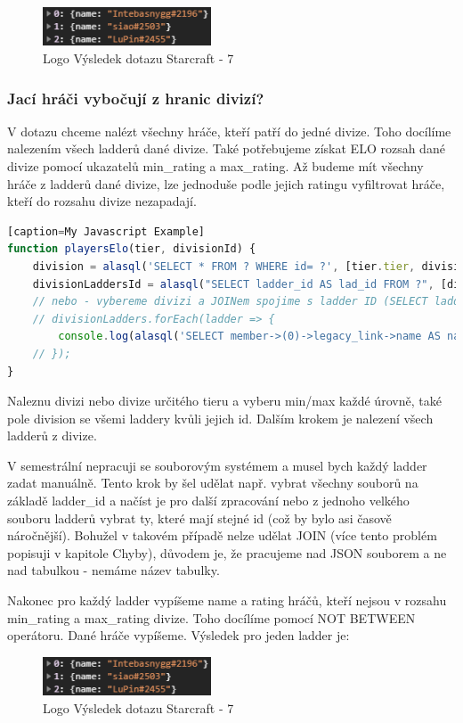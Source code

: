 \documentclass[a4, titlepage]{article}
\begin{document}
\begin{figure}[h]
    \centering
    \includegraphics[width=5cm]{S7}
    \caption{Logo Výsledek dotazu Starcraft - 7}
\end{figure} 

\subsubsection{Jací hráči vybočují z hranic divizí?}
V dotazu chceme nalézt všechny hráče, kteří patří do jedné divize. Toho docílíme nalezením všech ladderů dané divize. Také potřebujeme získat ELO rozsah dané divize pomocí ukazatelů min\_rating a max\_rating. Až budeme mít všechny hráče z ladderů dané divize, lze jednoduše podle jejich ratingu vyfiltrovat hráče, kteří do rozsahu divize nezapadají. 
\begin{lstlisting}[language=JavaScript][caption=My Javascript Example]
function playersElo(tier, divisionId) {
    division = alasql('SELECT * FROM ? WHERE id= ?', [tier.tier, divisionId]);
    divisionLaddersId = alasql("SELECT ladder_id AS lad_id FROM ?", [division[0].division]);
    // nebo - vybereme divizi a JOINem spojime s ladder ID (SELECT ladder.team FROM ladder INNER JOIN division ON division.ladder=ladder.id)
    // divisionLadders.forEach(ladder => {
    	console.log(alasql('SELECT member->(0)->legacy_link->name AS name, rating FROM ? WHERE rating NOT BETWEEN ? AND ?', [ladder230882_1101.team, division[0].min_rating, division[0].max_rating]));
    // });
}
\end{lstlisting}
Naleznu divizi nebo divize určitého tieru a vyberu min/max každé úrovně, také pole division se všemi laddery kvůli jejich id. Dalším krokem je nalezení všech ladderů z divize. 

V semestrální nepracuji se souborovým systémem a musel bych každý ladder zadat manuálně. Tento krok by šel udělat např. vybrat všechny souborů na základě ladder\_id a načíst je pro další zpracování nebo z jednoho velkého souboru ladderů vybrat ty, které mají stejné id (což by bylo asi časově náročnější). Bohužel v takovém případě nelze udělat JOIN (více tento problém popisuji v kapitole Chyby), důvodem je, že pracujeme nad JSON souborem a ne nad tabulkou - nemáme název tabulky.

Nakonec pro každý ladder vypíšeme name a rating hráčů, kteří nejsou v rozsahu min\_rating a max\_rating divize. Toho docílíme pomocí NOT BETWEEN operátoru. Dané hráče vypíšeme. Výsledek pro jeden ladder je: 
\begin{figure}[h]
    \centering
    \includegraphics[width=5cm]{S7}
    \caption{Logo Výsledek dotazu Starcraft - 7}
\end{figure} 
\end{document}
